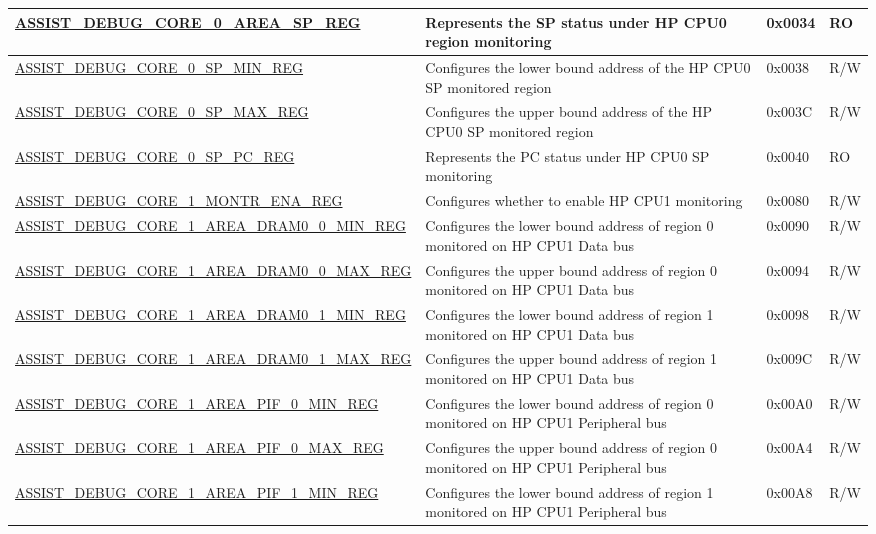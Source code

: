 \begin{longtable}{ | p{8.7cm} | m{5.3cm} | p{1.2cm} | p{1.2cm} | }
\hyperref[regdesc:ASSISTDEBUGCORE0AREASPREG]{ASSIST\_DEBUG\_CORE\_0\_AREA\_SP\_REG} & Represents the SP status under HP CPU0 region monitoring & 0x0034 & RO \\ \hline
\hyperref[regdesc:ASSISTDEBUGCORE0SPMINREG]{ASSIST\_DEBUG\_CORE\_0\_SP\_MIN\_REG} & Configures the lower bound address of the HP CPU0 SP monitored region & 0x0038 & R/W \\ \hline
\hyperref[regdesc:ASSISTDEBUGCORE0SPMAXREG]{ASSIST\_DEBUG\_CORE\_0\_SP\_MAX\_REG} & Configures the upper bound address of the HP CPU0 SP monitored region & 0x003C & R/W \\ \hline
\hyperref[regdesc:ASSISTDEBUGCORE0SPPCREG]{ASSIST\_DEBUG\_CORE\_0\_SP\_PC\_REG} & Represents the PC status under HP CPU0 SP monitoring & 0x0040 & RO \\ \hline
\hyperref[regdesc:ASSISTDEBUGCORE1MONTRENAREG]{ASSIST\_DEBUG\_CORE\_1\_MONTR\_ENA\_REG} & Configures whether to enable HP CPU1 monitoring & 0x0080 & R/W \\ \hline
\hyperref[regdesc:ASSISTDEBUGCORE1AREADRAM00MINREG]{ASSIST\_DEBUG\_CORE\_1\_AREA\_DRAM0\_0\_MIN\_REG} & Configures the lower bound address of region 0 monitored on HP CPU1 Data bus & 0x0090 & R/W \\ \hline
\hyperref[regdesc:ASSISTDEBUGCORE1AREADRAM00MAXREG]{ASSIST\_DEBUG\_CORE\_1\_AREA\_DRAM0\_0\_MAX\_REG} & Configures the upper bound address of region 0 monitored on HP CPU1 Data bus & 0x0094 & R/W \\ \hline
\hyperref[regdesc:ASSISTDEBUGCORE1AREADRAM01MINREG]{ASSIST\_DEBUG\_CORE\_1\_AREA\_DRAM0\_1\_MIN\_REG} & Configures the lower bound address of region 1 monitored on HP CPU1 Data bus & 0x0098 & R/W \\ \hline
\hyperref[regdesc:ASSISTDEBUGCORE1AREADRAM01MAXREG]{ASSIST\_DEBUG\_CORE\_1\_AREA\_DRAM0\_1\_MAX\_REG} & Configures the upper bound address of region 1 monitored on HP CPU1 Data bus & 0x009C & R/W \\ \hline
\hyperref[regdesc:ASSISTDEBUGCORE1AREAPIF0MINREG]{ASSIST\_DEBUG\_CORE\_1\_AREA\_PIF\_0\_MIN\_REG} & Configures the lower bound address of region 0 monitored on HP CPU1 Peripheral bus & 0x00A0 & R/W \\ \hline
\hyperref[regdesc:ASSISTDEBUGCORE1AREAPIF0MAXREG]{ASSIST\_DEBUG\_CORE\_1\_AREA\_PIF\_0\_MAX\_REG} & Configures the upper bound address of region 0 monitored on HP CPU1 Peripheral bus & 0x00A4 & R/W \\ \hline
\hyperref[regdesc:ASSISTDEBUGCORE1AREAPIF1MINREG]{ASSIST\_DEBUG\_CORE\_1\_AREA\_PIF\_1\_MIN\_REG} & Configures the lower bound address of region 1 monitored on HP CPU1 Peripheral bus & 0x00A8 & R/W \\ \hline

\end{longtable}
